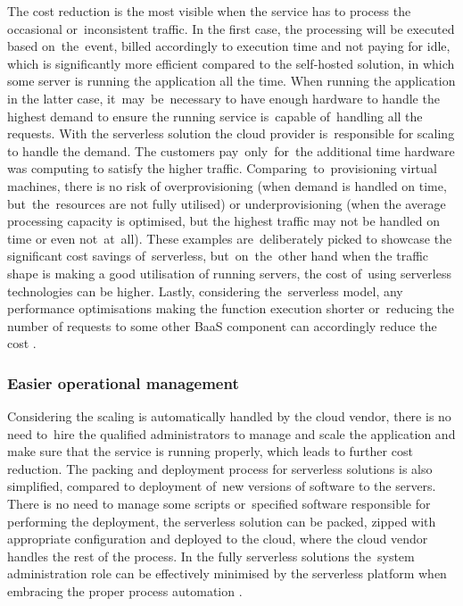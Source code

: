 The cost reduction is the most visible when the service has to process the occasional or~inconsistent traffic. In the first case, the processing will be executed based on~the~event, billed accordingly to execution time and not paying for idle, which is significantly more efficient compared to the self-hosted solution, in which some server is running the application all the time. When running the application in the latter case, it~may~be~necessary to have enough hardware to handle the highest demand to ensure the running service is~capable of~handling all the requests. With the serverless solution the cloud provider is~responsible for scaling to handle the demand. The customers pay~only~for~the additional time hardware was computing to satisfy the higher traffic. Comparing~to~provisioning virtual machines, there is no risk of overprovisioning (when demand is handled on time, but~the~resources are not fully utilised) or underprovisioning (when the average processing capacity is optimised, but the highest traffic may not be handled on time or even not~at~all). These examples are~deliberately picked to showcase the significant cost savings of~serverless, but~on~the~other hand when the traffic shape is making a good utilisation of running servers, the cost of~using serverless technologies can be higher. Lastly, considering the~serverless model, any performance optimisations making the function execution shorter or~reducing the number of requests to some other BaaS component can accordingly reduce the cost \cite{MartinFowlerServerless}.

\subsubsection{Easier operational management} \label{chapter:serverless-easier-operational-management}

Considering the scaling is automatically handled by the cloud vendor, there is no need to~hire the qualified administrators to manage and scale the application and make sure that the service is running properly, which leads to further cost reduction. The packing and deployment process for serverless solutions is also simplified, compared to deployment of~new versions of software to the servers. There is no need to manage some scripts or~specified software responsible for performing the deployment, the serverless solution can be packed, zipped with appropriate configuration and deployed to the cloud, where the cloud vendor handles the rest of the process. In the fully serverless solutions the~system administration role can be effectively minimised by the serverless platform when embracing the proper process automation \cite{MartinFowlerServerless}.

